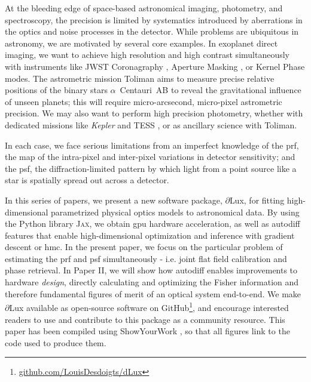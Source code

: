 \documentclass[]{spieman}
\newcommand\dlux{$\partial$Lux\xspace}
\begin{document}
At the bleeding edge of space-based astronomical imaging, photometry, and spectroscopy, the precision is limited by systematics introduced by aberrations in the optics and noise processes in the detector. While problems are ubiquitous in astronomy, we are motivated by several core examples. In exoplanet direct imaging, we want to achieve high resolution and high contrast simultaneously with instruments like JWST Coronagraphy \cite{Girard2022}, Aperture Masking \cite{Sivaramakrishnan2022}, or Kernel Phase \cite{Martinache2010,Kammerer2022} modes. The astrometric mission Toliman \cite{tuthill2018} aims to measure precise relative positions of the binary stars $\alpha$~Centauri~AB to reveal the gravitational influence of unseen planets; this will require micro-arcsecond, micro-pixel astrometric precision. We may also want to perform high precision photometry, whether with dedicated missions like \textit{Kepler} \cite{Borucki2010} and TESS \cite{Ricker2015}, or as ancillary science with Toliman. 

In each case, we face serious limitations from an imperfect knowledge of the \ac{prf}, the map of the intra-pixel and inter-pixel variations in detector sensitivity; and the \ac{psf}, the diffraction-limited pattern by which light from a point source like a star is spatially spread out across a detector.

In this series of papers, we present a new software package, \dlux, for fitting high-dimensional parametrized physical optics models to astronomical data. By using the Python library \textsc{Jax}\cite{jax}, we obtain \ac{gpu} hardware acceleration, as well as autodiff\cite{Margossian2018} features that enable high-dimensional optimization and inference with gradient descent or \ac{hmc}. In the present paper, we focus on the particular problem of estimating the \ac{prf} and \ac{psf} simultaneously - i.e. joint flat field calibration and phase retrieval. In Paper II, we will show how autodiff enables improvements to hardware \textit{design}, directly calculating and optimizing the Fisher information and therefore fundamental figures of merit of an optical system end-to-end. We make \dlux available as open-source software on GitHub\footnote{\href{https://github.com/LouisDesdoigts/dLux}{github.com/LouisDesdoigts/dLux}}, and encourage interested readers to use and contribute to this package as a community resource. This paper has been compiled using ShowYourWork \cite{Luger2021}, so that all figures link to the code used to produce them.
\end{document}
